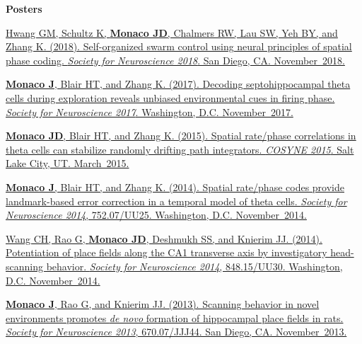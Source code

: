 \documentclass[10pt]{article}
\begin{document}
\begin{description}
\item \textbf{Posters}

\item[\quad] \href{https://abstractsonline.com/pp8/#!/4649/presentation/10884}{Hwang GM, Schultz K, \textbf{Monaco JD}, Chalmers RW, Lau SW, Yeh BY, and Zhang K. (2018). Self-organized swarm control using neural principles of spatial phase coding. \emph{Society for Neuroscience 2018}. San Diego, CA. November~2018.}
\item[\quad] \href{http://www.abstractsonline.com/pp8/#!/4376/presentation/6085}{\textbf{Monaco J}, Blair HT, and Zhang K. (2017). Decoding septohippocampal theta cells during exploration reveals unbiased environmental cues in firing phase. \emph{Society for Neuroscience 2017}. Washington, D.C. November~2017.}
\item[\quad] \href{http://jdmonaco.com/files/monaco-paper-cosyne15.pdf}{\textbf{Monaco JD}, Blair HT, and Zhang K. (2015). Spatial rate/phase correlations in theta cells can stabilize randomly drifting path integrators. \emph{COSYNE 2015}. Salt Lake City, UT. March~2015.}
\item[\quad] \href{http://www.abstractsonline.com/Plan/ViewAbstract.aspx?sKey=973d2662-ba7a-4ad2-aff9-fe0d4b77c262&cKey=9917ffaf-9e31-4213-acb9-4aab498ab4cd&mKey=54c85d94-6d69-4b09-afaa-502c0e680ca7}{\textbf{Monaco J}, Blair HT, and Zhang K. (2014). Spatial rate/phase codes provide landmark-based error correction in a temporal model of theta cells. \emph{Society for Neuroscience 2014}, 752.07/UU25. Washington, D.C. November~2014.}
\item[\quad] \href{http://www.abstractsonline.com/Plan/ViewAbstract.aspx?sKey=bfb59866-8deb-44a6-9515-a7aab630507b&cKey=d201b3aa-7725-452e-b0dd-c41d204b5b54&mKey=54c85d94-6d69-4b09-afaa-502c0e680ca7}{Wang CH, Rao G, \textbf{Monaco JD}, Deshmukh SS, and Knierim JJ. (2014). Potentiation of place fields along the CA1 transverse axis by investigatory head-scanning behavior. \emph{Society for Neuroscience 2014}, 848.15/UU30. Washington, D.C. November~2014.}
\item[\quad] \href{http://www.abstractsonline.com/Plan/ViewAbstract.aspx?sKey=32eccac1-4e1d-4e81-bf5c-f39bcb605757&cKey=4710dece-cc8e-4b48-8764-49ea174b91ef&mKey=8d2a5bec-4825-4cd6-9439-b42bb151d1cf}{\textbf{Monaco J}, Rao G, and Knierim JJ. (2013). Scanning behavior in novel environments promotes \emph{de novo} formation of hippocampal place fields in rats. \emph{Society for Neuroscience 2013}, 670.07/JJJ44. San Diego, CA. November~2013.}

\end{description}
\end{document}
